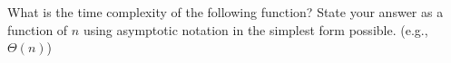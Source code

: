 \begin{prob}
    What is the time complexity of the following function? 
    State your answer as a function of $n$ using asymptotic notation in 
    the simplest form possible. (e.g., $\Theta(n)$)

    \inputminted[lastline=6]{python}{code.py}


\end{prob}
